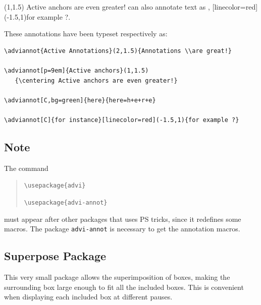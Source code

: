 \documentclass[12pt]{article}
\begin{document}
\noindent
{}(1,1.5)
{\centering Active anchors are even greater!}
can also annotate text as ,
[linecolor=red](-1.5,1){for example ?}.

\medskip

\noindent
These annotations have been typeset respectively as:
\begin{small}
\begin{verbatim}
\adviannot{Active Annotations}(2,1.5){Annotations \\are great!}

\adviannot[p=9em]{Active anchors}(1,1.5)
   {\centering Active anchors are even greater!}

\adviannot[C,bg=green]{here}{here=h+e+r+e}

\adviannot[C]{for instance}[linecolor=red](-1.5,1){for example ?}
\end{verbatim}
\end{small}

\subsection*{Note}

The command 
\begin{quote}

\verb"\usepackage{advi}"

\verb"\usepackage{advi-annot}"

\end{quote}
must appear after other packages that uses PS tricks, since it redefines
some macros.  The package \verb"advi-annot" is necessary to get
the annotation macros.

\newpage

\subsection*{Superpose Package}

This very small package allows the superimposition of boxes, making the
surrounding box large enough to fit all the included boxes. This is convenient
when displaying each included box at different pauses.
\end{document}
